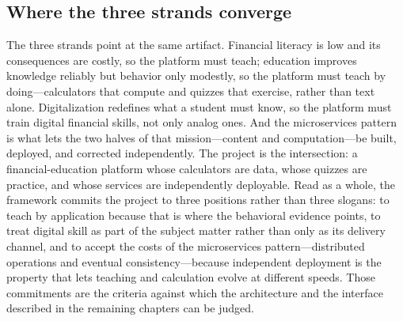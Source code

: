 \subsection{Where the three strands converge}

The three strands point at the same artifact. Financial literacy is low and
its consequences are costly, so the platform must teach; education improves
knowledge reliably but behavior only modestly, so the platform must teach by
doing---calculators that compute and quizzes that exercise, rather than text
alone. Digitalization redefines what a student must know, so the platform must
train digital financial skills, not only analog ones. And the microservices
pattern is what lets the two halves of that mission---content and
computation---be built, deployed, and corrected independently. The project is
the intersection: a financial-education platform whose calculators are data,
whose quizzes are practice, and whose services are independently deployable.
Read as a whole, the framework commits the project to three positions rather
than three slogans: to teach by application because that is where the
behavioral evidence points, to treat digital skill as part of the subject
matter rather than only as its delivery channel, and to accept the costs of
the microservices pattern---distributed operations and eventual
consistency---because independent deployment is the property that lets
teaching and calculation evolve at different speeds. Those commitments are
the criteria against which the architecture and the interface described in
the remaining chapters can be judged.
